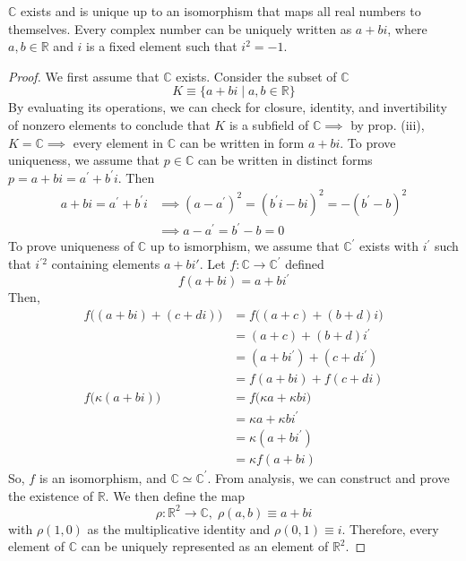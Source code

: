 \documentclass{article}
\begin{document}
    \begin{theorem}
      $\mathbb{C}$ exists and is unique up to an isomorphism that maps all real numbers to themselves. Every complex number can be uniquely written as $a + bi$, where $a, b \in \mathbb{R}$ and $i$ is a fixed element such that $i^2 = -1$. 
    \end{theorem}
    \begin{proof}
      We first assume that $\mathbb{C}$ exists. Consider the subset of $\mathbb{C}$
      \[K \equiv \{ a + bi \; | \; a, b \in \mathbb{R}\} \]
      By evaluating its operations, we can check for closure, identity, and invertibility of nonzero elements to conclude that $K$ is a subfield of $\mathbb{C} \implies$ by prop. (iii), $K = \mathbb{C} \implies$ every element in $\mathbb{C}$ can be written in form $a + bi$. To prove uniqueness, we assume that $p \in \mathbb{C}$ can be written in distinct forms $p = a + bi = a^{\prime} + b^\prime i$. Then
      \begin{align*}
           a + bi = a^{\prime} + b^\prime i & \implies (a - a^\prime)^2 = (b^\prime i - b i)^2 = - (b^\prime - b)^2 \\
           & \implies a - a^\prime = b^\prime - b = 0
      \end{align*}
      To prove uniqueness of $\mathbb{C}$ up to ismorphism, we assume that $\mathbb{C}^\prime$ exists with $i^\prime$ such that $i^{\prime 2}$ containing elements $a + b i'$. Let $f: \mathbb{C} \longrightarrow \mathbb{C}^\prime$ defined 
      \[ f( a + bi) = a + bi^\prime\]
      Then, 
      \begin{align*}
        f\big((a + b i) + (c + d i) \big) & = f\big( (a + c) + (b + d)i \big) \\
        & = (a + c) + (b + d) i^\prime \\
        & = (a + b i^\prime) + (c + d i^\prime) \\
        & = f(a + b i) + f( c + d i) \\
        f\big( \kappa (a + b i)\big) & = f\big( \kappa a + \kappa b i\big) \\
        & = \kappa a + \kappa b i^\prime \\
        & = \kappa (a + b i^\prime) \\
        & = \kappa f(a + b i)
      \end{align*}
      So, $f$ is an isomorphism, and $\mathbb{C} \simeq \mathbb{C}^\prime$. From analysis, we can construct and prove the existence of $\mathbb{R}$. We then define the map
      \[ \rho: \mathbb{R}^2 \longrightarrow \mathbb{C}, \; \rho(a, b) \equiv a + bi\]
      with $\rho(1, 0)$ as the multiplicative identity and $\rho(0,1) \equiv i$. Therefore, every element of $\mathbb{C}$ can be uniquely represented as an element of $\mathbb{R}^2$. 
    \end{proof}
\end{document}
